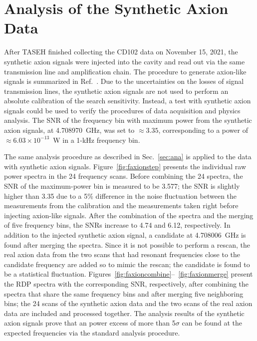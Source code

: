 \section{Analysis of the Synthetic Axion Data}\label{sec:faxion}
After TASEH finished collecting the CD102 data on November 15, 2021, 
the synthetic axion signals were injected into the cavity and read out via the 
same transmission line and amplification chain. The procedure 
to generate axion-like signals is summarized in 
Ref.~\cite{TASEHInstrumentation}. 
Due to the uncertainties on the losses of signal transmission
 lines, the synthetic axion signals are not used to perform an absolute 
calibration of the search sensitivity. Instead, 
a test with synthetic axion signals could be used to verify the procedures of 
data acquisition and physics analysis. The 
SNR of the frequency bin with maximum power from the 
synthetic axion signals, at 4.708970~GHz, was set to $\approx 3.35$, 
corresponding to a power of $\approx 6.03 \times 10^{-13}$~W in a 1-kHz 
frequency bin.  

The same analysis procedure as described in Sec.~\ref{sec:ana} is applied 
to the data with synthetic axion signals. 
Figure~\ref{fig:faxionstep} presents the individual raw power spectra in 
the 24 frequency scans. Before combining 
the 24 spectra, the SNR of the maximum-power bin is measured to be 
3.577; the SNR is slightly higher than 3.35 due to a 
5\% difference in the noise fluctuation between the measurements from 
the calibration and the measurements taken 
right before injecting axion-like signals. After the combination 
of the spectra and the merging of five frequency 
bins, the SNRs increase to 4.74 and 6.12, respectively. In addition to the 
injected synthetic axion signal, a candidate at 4.708006~GHz is found after 
merging the spectra. Since it is not possible to perform a rescan, 
the real axion data from the two scans that had resonant frequencies close to 
the candidate frequency are added so to mimic the rescan; the candidate is 
found to be a statistical fluctuation.  
Figures~\ref{fig:faxioncombine}--~\ref{fig:faxionmerge} present 
the RDP spectra with the corresponding SNR, respectively, after combining 
the spectra that share the same frequency bins and after merging five 
neighboring bins; the 24 scans of the synthetic axion data and the two 
scans of the real axion data are included and processed together. 
The analysis results of the synthetic axion signals prove that an power 
excess of more than 5$\sigma$ can be found at the expected frequencies via 
the standard analysis procedure.  

